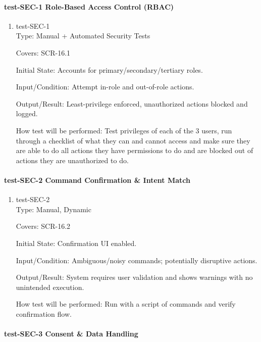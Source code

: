 \documentclass[12pt, titlepage]{article}
\begin{document}
\paragraph{test-SEC-1 Role-Based Access Control (RBAC)}

\begin{enumerate}
\item{test-SEC-1\\}
Type: Manual + Automated Security Tests

Covers: SCR-16.1

Initial State: Accounts for primary/secondary/tertiary roles.

Input/Condition: Attempt in-role and out-of-role actions.

Output/Result: Least-privilege enforced, unauthorized actions blocked and logged.

How test will be performed: Test privileges of each of the 3 users, run through a checklist of what they can and cannot access and make sure they are able to do all actions they have permissions to do and are blocked out of actions they are unauthorized to do.
\end{enumerate}

\paragraph{test-SEC-2 Command Confirmation \& Intent Match}

\begin{enumerate}
\item{test-SEC-2\\}
Type: Manual, Dynamic

Covers: SCR-16.2

Initial State: Confirmation UI enabled.

Input/Condition: Ambiguous/noisy commands; potentially disruptive actions.

Output/Result: System requires user validation and shows warnings with no unintended execution.

How test will be performed: Run with a script of commands and verify confirmation flow.
\end{enumerate}

\paragraph{test-SEC-3 Consent \& Data Handling}
\end{document}
